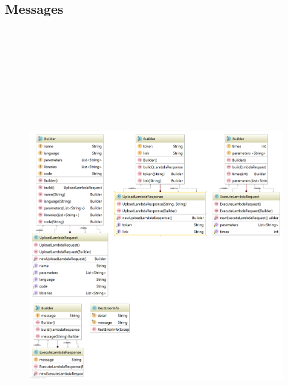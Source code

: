 \documentclass[a4paper,20pt,oneside]{book}
\begin{document}
    \subsection{Messages}
	    \begin{figure}[!hb]
	    	\includegraphics[width=18cm,height=20cm]{messagesdiagram}
	    \end{figure}
\end{document}
